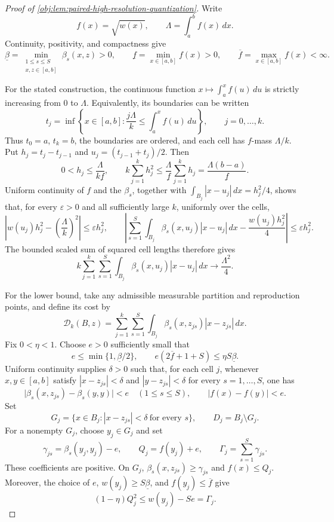 \begin{proof}[Proof of \cref{obj:lem:paired-high-resolution-quantization}]
Write
\[
f(x)=\sqrt{w(x)},\qquad \Lambda=\int_a^b f(x)\,dx.
\]
Continuity, positivity, and compactness give
\[
\underline\beta
=\min_{\substack{1\le s\le S\\x,z\in[a,b]}}\beta_s(x,z)>0,
\qquad
\underline f=\min_{x\in[a,b]}f(x)>0,
\qquad
\overline f=\max_{x\in[a,b]}f(x)<\infty.
\]

For the stated construction, the continuous function \(x\mapsto\int_a^x f(u)\,du\) is strictly increasing from \(0\) to \(\Lambda\). Equivalently, its boundaries can be written
\[
t_j=\inf\left\{x\in[a,b]:
\frac{j\Lambda}{k}\le\int_a^x f(u)\,du\right\},
\qquad j=0,\ldots,k.
\]
Thus \(t_0=a\), \(t_k=b\), the boundaries are ordered, and each cell has \(f\)-mass \(\Lambda/k\). Put \(h_j=t_j-t_{j-1}\) and \(u_j=(t_{j-1}+t_j)/2\). Then
\[
0<h_j\le\frac{\Lambda}{k\underline f},
\qquad
k\sum_{j=1}^k h_j^2
\le\frac{\Lambda}{\underline f}\sum_{j=1}^k h_j
=\frac{\Lambda(b-a)}{\underline f}.
\]
Uniform continuity of \(f\) and the \(\beta_s\), together with
\(\int_{B_j}|x-u_j|\,dx=h_j^2/4\), shows that, for every \(\varepsilon>0\) and all sufficiently large \(k\), uniformly over the cells,
\[
\left|w(u_j)h_j^2-\left(\frac{\Lambda}{k}\right)^2\right|
\le\varepsilon h_j^2,
\qquad
\left|
\sum_{s=1}^S\int_{B_j}\beta_s(x,u_j)|x-u_j|\,dx
-\frac{w(u_j)h_j^2}{4}
\right|
\le\varepsilon h_j^2.
\]
The bounded scaled sum of squared cell lengths therefore gives
\[
k\sum_{j=1}^k\sum_{s=1}^S
\int_{B_j}\beta_s(x,u_j)|x-u_j|\,dx
\longrightarrow\frac{\Lambda^2}{4}.
\]

For the lower bound, take any admissible measurable partition and reproduction points, and define its cost by
\[
\mathcal D_k(B,z)
=\sum_{j=1}^k\sum_{s=1}^S
\int_{B_j}\beta_s(x,z_{js})|x-z_{js}|\,dx.
\]
Fix \(0<\eta<1\). Choose \(e>0\) sufficiently small that
\[
e\le\min\{1,\underline\beta/2\},
\qquad
e(2\overline f+1+S)\le\eta S\underline\beta.
\]
Uniform continuity supplies \(\delta>0\) such that, for each cell \(j\), whenever \(x,y\in[a,b]\) satisfy \(|x-z_{js}|<\delta\) and \(|y-z_{js}|<\delta\) for every \(s=1,\ldots,S\), one has
\[
\bigl|\beta_s(x,z_{js})-\beta_s(y,y)\bigr|<e
\quad(1\le s\le S),
\qquad |f(x)-f(y)|<e.
\]
Set
\[
G_j=\{x\in B_j:|x-z_{js}|<\delta\ \text{for every }s\},
\qquad D_j=B_j\setminus G_j.
\]
For a nonempty \(G_j\), choose \(y_j\in G_j\) and set
\[
\gamma_{js}=\beta_s(y_j,y_j)-e,\qquad
Q_j=f(y_j)+e,\qquad
\Gamma_j=\sum_{s=1}^S\gamma_{js}.
\]
These coefficients are positive. On \(G_j\), \(\beta_s(x,z_{js})\ge\gamma_{js}\) and \(f(x)\le Q_j\). Moreover, the choice of \(e\), \(w(y_j)\ge S\underline\beta\), and \(f(y_j)\le\overline f\) give
\[
(1-\eta)Q_j^2
\le w(y_j)-Se
=\Gamma_j.
\]


\end{proof}
